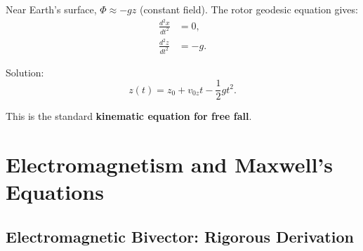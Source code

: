 \documentclass[12pt,a4paper]{article}
\theoremstyle{definition}
\theoremstyle{remark}
\begin{document}
Near Earth's surface, $\Phi \approx -g z$ (constant field). The rotor geodesic equation gives:
\begin{align}
\frac{d^2 x}{dt^2} &= 0, \\
\frac{d^2 z}{dt^2} &= -g.
\end{align}

Solution:
\begin{equation}
z(t) = z_0 + v_{0z} t - \frac{1}{2}g t^2.
\end{equation}

This is the standard \textbf{kinematic equation for free fall}.

\section{Electromagnetism and Maxwell's Equations}

\subsection{Electromagnetic Bivector: Rigorous Derivation}
\end{document}
